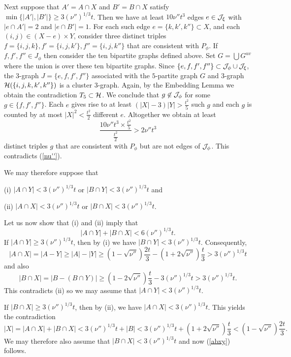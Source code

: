 \documentclass[11pt]{article}
\begin{document}
Next suppose that $A'=A \cap X$ and $B'=B \cap X$ satisfy
$\min\{|A'|, |B'|\}\ge 3(\nu'')^{1/3}t$.  Then we have at least
$10\nu''t^3$ edges $e \in {\cal J}_{\xi}$ with $|e \cap A'|=2$ and $|e
\cap B'|=1$.  For each such edge $e=\{k,k',k''\}\subset X$, and each
$(i,j) \in (X-e)\times Y$, consider three distinct triples
$f=\{i,j,k\},f'=\{i,j,k'\}, f''=\{i,j,k''\}$ that are consistent
with $P_{\phi}$. If $f, f', f'' \in J_{\phi}$ then consider the ten
bipartite graphs defined above. Set $G=\bigcup G^{uv}$ where the
union is over these ten bipartite graphs.
 Since $\{e,f,f', f''\} \subset {\cal J}_{\phi} \cup {\cal J}_{\xi}$, the 3-graph  $J=\{e, f,f', f''\}$ associated with the
 $5$-partite graph $G$ and $3$-graph $\mathcal{H}(\{i,j,k,k',k''\})$ is a cluster $3$-graph.
Again, by the Embedding Lemma we obtain the contradiction  $T_5 \subset
\mathcal{H}$. We conclude that $g\not\in {\cal J}_{\phi}$ for some $g\in \{f, f',
f''\}$.  Each $e$ gives rise to at least $(|X|-3)|Y|>\frac{t^2}{5}$
such $g$ and each $g$ is counted by at most
$|X|^2 < \frac{t^2}{2}$ different $e$. Altogether we obtain at least
$$\frac{10\nu'' t^3 \times \frac{t^2}{5}}{\frac{t^2}{2}} > 2\nu'' t^3$$
distinct triples $g$ that are consistent with  $P_{\phi}$ but are
not edges of ${\cal J}_{\phi}$.  This contradicts (\ref{nu''}).

We may therefore suppose that

(i) $|A \cap Y|<3(\nu'')^{1/3}t$ or $|B \cap Y|<3(\nu'')^{1/3}t$ and

(ii) $|A \cap X|<3(\nu'')^{1/3}t$ or $|B \cap X|<3(\nu'')^{1/3}t$.

Let us now show that (i) and (ii) imply that
\begin{equation} \label{abxy}
|A \cap Y| + | B \cap X| <6(\nu'')^{1/3} t.\end{equation}
If $|A \cap Y| \ge 3(\nu'')^{1/3}t$, then by (i) we have $|B \cap Y| < 3(\nu'')^{1/3}t$. Consequently,
$$|A \cap X|=|A-Y|\ge |A|-|Y|\ge (1-\sqrt{\nu''})\frac{2t}{3}-(1+2\sqrt{\nu''})\frac{t}{3}>3(\nu'')^{1/3}t$$
and also
$$|B \cap X|=|B-(B \cap Y)|\ge (1-2\sqrt{\nu''})\frac{t}{3}-3(\nu'')^{1/3}t>3(\nu'')^{1/3}t.$$
This contradicts (ii) so we may assume that $|A \cap Y| < 3(\nu'')^{1/3}t$.

If $|B \cap X| \ge 3(\nu'')^{1/3}t$, then by (ii), we have $|A \cap X| <  3(\nu'')^{1/3}t$. This yields the contradiction
$$|X|=|A\cap X|+| B \cap X|< 3(\nu'')^{1/3}t +|B|<3(\nu'')^{1/3}t+(1+2\sqrt{\nu''})\frac{t}{3}
<(1-\sqrt{\nu''})\frac{2t}{3}.$$
We may therefore also assume that $|B \cap X| < 3(\nu'')^{1/3}t$ and now (\ref{abxy}) follows.
\end{document}
